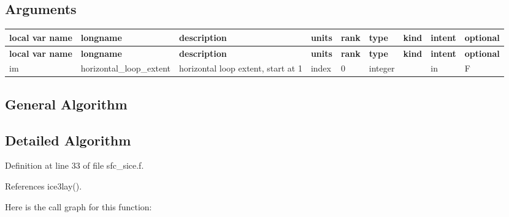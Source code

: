 \hypertarget{group___g_f_s___ice_arg_table_sice_run}{}\subsection{Arguments}\label{group___g_f_s___ice_arg_table_sice_run}
\tabulinesep=1mm
\begin{longtabu} spread 0pt [c]{*{9}{|X[-1]}|}
\hline
\rowcolor{\tableheadbgcolor}\textbf{ local var name }&\textbf{ longname }&\textbf{ description }&\textbf{ units }&\textbf{ rank }&\textbf{ type }&\textbf{ kind }&\textbf{ intent }&\textbf{ optional  }\\
\endfirsthead
\hline
\endfoot
\hline
\rowcolor{\tableheadbgcolor}\textbf{ local var name }&\textbf{ longname }&\textbf{ description }&\textbf{ units }&\textbf{ rank }&\textbf{ type }&\textbf{ kind }&\textbf{ intent }&\textbf{ optional  }\\
\endhead
im &horizontal\+\_\+loop\+\_\+extent &horizontal loop extent, start at 1 &index &0 &integer &&in &F \\
\end{longtabu}
\hypertarget{group___g_f_s___n_s_s_t_general}{}\subsection{General Algorithm}\label{group___g_f_s___n_s_s_t_general}
\hypertarget{group___g_f_s___n_s_s_t_detailed}{}\subsection{Detailed Algorithm}\label{group___g_f_s___n_s_s_t_detailed}


Definition at line 33 of file sfc\+\_\+sice.\+f.



References ice3lay().

Here is the call graph for this function\+:
